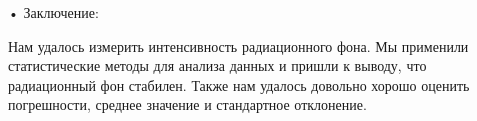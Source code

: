	
	
	• Заключение:
	\newline
	
Нам удалось измерить интенсивность радиационного фона. Мы применили статистические методы для анализа данных и пришли к выводу, что радиационный фон стабилен. Также нам удалось довольно хорошо оценить погрешности, среднее значение и стандартное отклонение.
